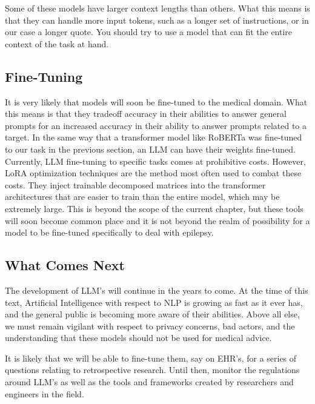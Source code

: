 Some of these models have larger context lengths than others. What this means is that they can handle more input tokens, such as a longer set of instructions, or in our case a longer quote.
You should try to use a model that can fit the entire context of the task at hand.

\subsection{Fine-Tuning}

It is very likely that models will soon be fine-tuned to the medical domain. What this means is that they tradeoff accuracy in their abilities to answer general prompts for an increased accuracy in their ability to answer prompts related to a target.
In the same way that a transformer model like RoBERTa was fine-tuned to our task in the previous section, an LLM can have their weights fine-tuned.
Currently, LLM fine-tuning to specific tasks comes at prohibitive costs. However, LoRA\cite{hu2021lora} optimization techniques are the method most often used to combat these costs. They inject trainable decomposed matrices into the transformer architectures that
are easier to train than the entire model, which may be extremely large.
This is beyond the scope of the current chapter, but these tools will soon become common place and it is not beyond the realm of possibility for a model to be fine-tuned specifically to deal with
epilepsy.

\subsection{What Comes Next}

The development of LLM's will continue in the years to come. At the time of this text, Artificial Intelligence with respect to NLP is growing as fast as it ever has, and the general public is becoming more aware of their abilities. Above all else, we
must remain vigilant with respect to privacy concerns, bad actors, and the understanding that these models should not be used for medical advice.

It is likely that we will be able to fine-tune them, say on EHR's, for a series of questions relating to retrospective research. Until then, monitor the regulations around LLM's as well as the tools and frameworks created by researchers and engineers in the field.
